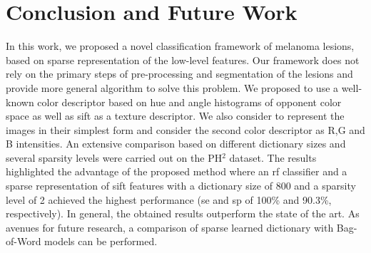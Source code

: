 \section{Conclusion and Future Work}
\label{sec:con}
In this work, we proposed a novel classification framework of melanoma lesions, based on sparse representation of the low-level features. 
Our framework does not rely on the primary steps of pre-processing and segmentation of the lesions and provide more general algorithm to solve this problem. 
We proposed to use a well-known color descriptor based on hue and angle histograms of opponent color space as well as \ac{sift} as a texture descriptor. 
We also consider to represent the images in their simplest form and consider the second color descriptor as R,G and B intensities.
An extensive comparison based on different dictionary sizes and several sparsity levels were carried out on the PH$^{2}$ dataset. 
The results highlighted the advantage of the proposed method where an \ac{rf} classifier and a sparse representation of \ac{sift} features with a dictionary size of 800 and a sparsity level of 2 achieved the highest performance (\ac{se} and \ac{sp} of 100\% and 90.3\%, respectively).
In general, the obtained results outperform the state of the art.
As avenues for future research, a comparison of sparse learned dictionary with Bag-of-Word models can be performed.



